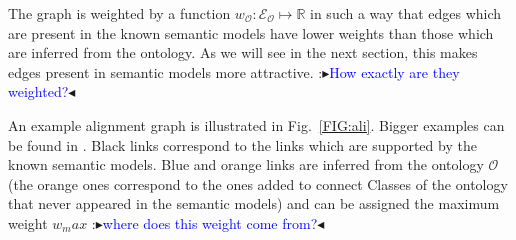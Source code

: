 \documentclass[letterpaper]{article} %
\newcommand{\authornote}[3]{
  {\fbox{\sc 
  #1}:$\blacktriangleright$\textcolor{#2}{\small{#3}}$\blacktriangleleft$}%
}
\newcommand{\ddg}[1]{\authornote{DDG}{blue}{#1}}
\begin{document}
The graph is weighted by a function $w_\mathcal{O} : \mathcal{E_O} \mapsto 
\mathbb{R}$ in 
such a way that edges which are present in
the known semantic models have lower weights than those 
which are inferred from the ontology.
As we will see in the next section, this makes edges present in semantic models more attractive. \ddg{How exactly are 
they weighted?}

An example alignment graph is illustrated in Fig.~\ref{FIG:ali}. 
Bigger examples can be found in \cite{Taheriyan2013}. 
Black links correspond to the links which are supported by the known semantic models. 
Blue and orange links are inferred from the ontology $\mathcal{O}$ (the orange ones correspond to the ones added to connect Classes of the ontology that never appeared in the semantic models) and can be assigned the 
maximum weight $w_max$ \ddg{where does this weight come from?}
\end{document}

